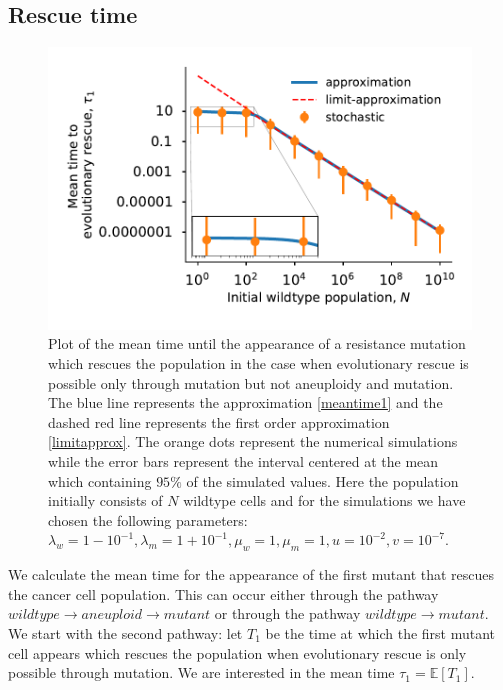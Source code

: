 \documentclass[12pt]{extarticle}
\begin{document}
\subsection*{Rescue time}
\begin{figure}[!t]
 \vspace*{1\baselineskip}
\includegraphics[width=1\textwidth]{Figures/MeanTimeGrowthMutantDirectPlot.pdf}
\caption{Plot of the mean time until the appearance of a resistance mutation which rescues the population in the case when evolutionary rescue is possible only through mutation but not aneuploidy and mutation.  The blue line represents the approximation \eqref{meantime1} and the dashed red line represents the first order approximation \eqref{limitapprox}. The orange dots represent the numerical simulations while the error bars represent the interval centered at the mean which containing $95\%$ of the simulated values. Here the population initially consists of $N$ wildtype cells and for the simulations we have chosen the following parameters: $\lambda_w=1-10^{-1},\lambda_m=1+10^{-1},\mu_w=1,\mu_m=1,u=10^{-2},v=10^{-7}$.}
\label{MeanTimeGrowthAneuploidyPlot}
\end{figure}
We calculate the mean time for the appearance of the first mutant that rescues the cancer cell population. This can occur either through the pathway $wildtype\rightarrow aneuploid \rightarrow mutant$ or through the pathway $wildtype \rightarrow mutant$. We start with the second pathway: let $T_1$ be the time at which the first mutant cell appears which rescues the population when evolutionary rescue is only possible through mutation. We are interested in the mean time $\tau_1=\mathbb{E}\left[T_1\right]$.
\end{document}
